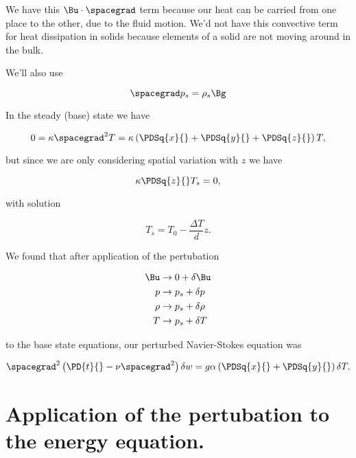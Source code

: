We have this $\Bu \cdot \spacegrad$ term because our heat can be carried from one place to the other, due to the fluid motion.  We'd not have this convective term for heat dissipation in solids because elements of a solid are not moving around in the bulk.

We'll also use 

\begin{equation}\label{eqn:continuumL22:70}
\spacegrad p_s = \rho_s \Bg
\end{equation}

In the steady (base) state we have

\begin{equation}\label{eqn:continuumL22:90}
0 = \kappa \spacegrad^2 T = 
\kappa \left( 
\PDSq{x}{}
+\PDSq{y}{}
+\PDSq{z}{} \right) T,
\end{equation}

but since we are only considering spatial variation with $z$ we have

\begin{equation}\label{eqn:continuumL22:110}
\kappa \PDSq{z}{} T_s = 0,
\end{equation}

with solution

\begin{equation}\label{eqn:continuumL22:130}
T_s = T_0 - \frac{\Delta T}{d} z.
\end{equation}

We found that after application of the pertubation

\begin{align}\label{eqn:continuumL22:150}
\Bu &\rightarrow 0 + \delta \Bu \\
p &\rightarrow p_s + \delta p \\
\rho &\rightarrow p_s + \delta \rho \\
T &\rightarrow p_s + \delta T
\end{align}

to the base state equations, our perturbed Navier-Stokes equation was

\begin{equation}\label{eqn:continuumL22:170}
\spacegrad^2 \left( \PD{t}{} - \nu \spacegrad^2 \right) \delta w = g \alpha 
\left(
\PDSq{x}{}
+\PDSq{y}{}
\right)
\delta T.
\end{equation}

\section{Application of the pertubation to the energy equation.}

